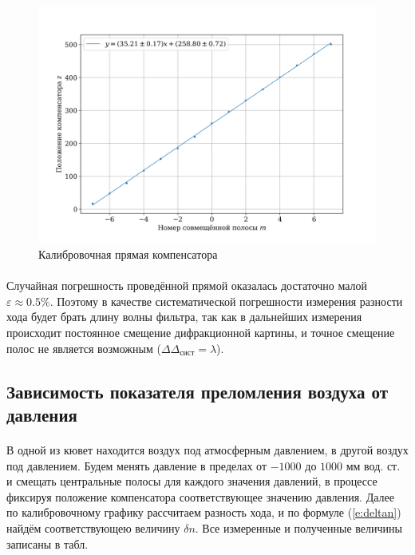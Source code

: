 \documentclass[a4paper,12pt]{article} %
\begin{document}
\begin{figure}
\centering
\includegraphics[width=\textwidth]{plot1.png}
\caption{Калибровочная прямая компенсатора}
\label{f:cal}
\end{figure}

\paragraph{} Случайная погрешность проведённой прямой оказалась достаточно малой $\varepsilon \approx 0.5 \%$. Поэтому в качестве систематической погрешности измерения разности хода будет брать длину волны фильтра, так как в дальнейших измерения происходит постоянное смещение дифракционной картины, и точное смещение полос не является возможным ($\Delta \Delta_\text{сист} = \lambda$).

\subsection{Зависимость показателя преломления воздуха от давления}

\paragraph{} В одной из кювет находится воздух под атмосферным давлением, в другой воздух под давлением. Будем менять давление в пределах от $-1000$ до $1000$ мм вод. ст. и смещать центральные полосы для каждого значения давлений, в процессе фиксируя положение компенсатора соответствующее значению давления. Далее по калибровочному графику рассчитаем разность хода, и по формуле (\ref{e:deltan}) найдём соответствующею величину $\delta n$. Все измеренные и полученные величины записаны в табл. 
\end{document}
